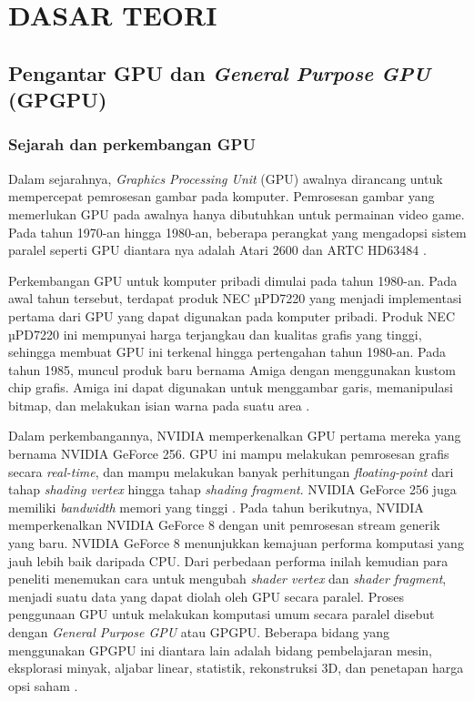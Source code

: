 \chapter{DASAR TEORI}

\section{Pengantar GPU dan \emph{General Purpose GPU} (GPGPU)}

\subsection{Sejarah dan perkembangan GPU}


Dalam sejarahnya, \emph{Graphics Processing Unit} (GPU) awalnya dirancang untuk
mempercepat pemrosesan gambar pada komputer. Pemrosesan gambar yang memerlukan
GPU pada awalnya hanya dibutuhkan untuk permainan video game. Pada tahun
1970-an hingga 1980-an, beberapa perangkat yang mengadopsi sistem paralel
seperti GPU diantara nya adalah Atari 2600 dan ARTC HD63484
\citep{wikipediaGraphicsProcessingUnit2023}.

Perkembangan GPU untuk komputer pribadi dimulai pada tahun 1980-an. Pada awal
tahun tersebut, terdapat produk NEC µPD7220 yang menjadi implementasi pertama
dari GPU yang dapat digunakan pada komputer pribadi. Produk NEC µPD7220 ini
mempunyai harga terjangkau dan kualitas grafis yang tinggi, sehingga membuat
GPU ini terkenal hingga pertengahan tahun 1980-an. Pada tahun 1985, muncul
produk baru bernama Amiga dengan menggunakan kustom chip grafis. Amiga ini
dapat digunakan untuk menggambar garis, memanipulasi bitmap, dan melakukan
isian warna pada suatu area \citep{wikipediaGraphicsProcessingUnit2023}.

Dalam perkembangannya, NVIDIA memperkenalkan GPU pertama mereka yang bernama
NVIDIA GeForce 256. GPU ini mampu melakukan pemrosesan grafis secara
\emph{real-time}, dan mampu melakukan banyak perhitungan \emph{floating-point} dari
tahap \emph{shading vertex} hingga tahap \emph{shading fragment}. NVIDIA GeForce 256 juga
memiliki \emph{bandwidth} memori yang tinggi
\citep{dallyEvolutionGraphicsProcessing2021}. Pada tahun berikutnya, NVIDIA
memperkenalkan NVIDIA GeForce 8 dengan unit pemrosesan stream generik yang
baru. NVIDIA GeForce 8 menunjukkan kemajuan performa komputasi yang jauh lebih
baik daripada CPU. Dari perbedaan performa inilah kemudian para peneliti
menemukan cara untuk mengubah \emph{shader vertex} dan \emph{shader fragment}, menjadi suatu
data yang dapat diolah oleh GPU secara paralel. Proses penggunaan GPU untuk
melakukan komputasi umum secara paralel disebut dengan \emph{General Purpose
	GPU} atau GPGPU. Beberapa bidang yang menggunakan GPGPU ini diantara lain
adalah bidang pembelajaran mesin, eksplorasi minyak, aljabar linear, statistik,
rekonstruksi 3D, dan penetapan harga opsi saham
\citep{wikipediaGraphicsProcessingUnit2023}.

